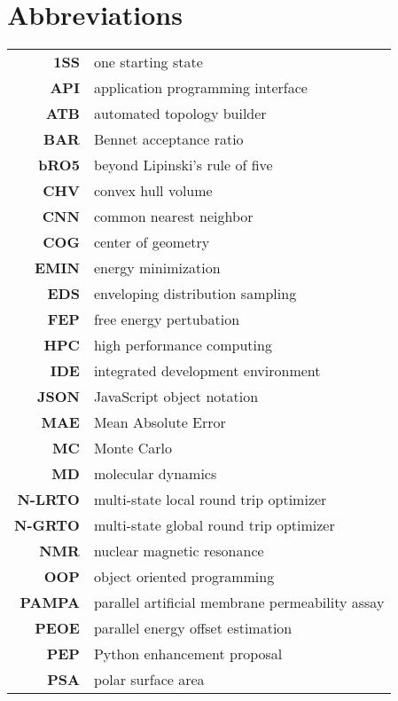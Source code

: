 \chapter{Abbreviations}
\begin{center}
\begin{longtable}{ >{\bfseries}r l}

 1SS & one starting state \\
 API & application programming interface\\
 ATB & automated topology builder \\

 BAR & Bennet acceptance ratio \\
 bRO5 & beyond Lipinski's rule of five \\

 CHV & convex hull volume\\
 CNN & common nearest neighbor\\
 COG & center of geometry\\
 
 EMIN & energy minimization\\
 EDS & enveloping distribution sampling \\
 FEP & free energy pertubation \\

 HPC & high performance computing \\
 IDE & integrated development environment\\

 JSON & JavaScript object notation\\

 MAE & Mean Absolute Error\\
 MC  & Monte Carlo \\
 MD  & molecular dynamics\\ 
 N-LRTO & multi-state local round trip optimizer \\
 N-GRTO & multi-state global round trip optimizer \\
 NMR & nuclear magnetic resonance\\
 
 OOP & object oriented programming\\

 PAMPA & parallel artificial membrane permeability assay\\
 PEOE & parallel energy offset estimation\\
 PEP & Python enhancement proposal\\
 PSA & polar surface area\\


\end{longtable}
\end{center}
